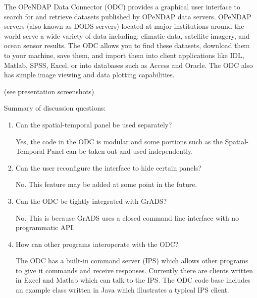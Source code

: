 The OPeNDAP Data Connector (ODC) provides a graphical user interface to search 
for and retrieve datasets published by OPeNDAP data servers. OPeNDAP servers 
(also known as DODS servers) located at major institutions around the world serve a 
wide variety of data including: climatic data, satellite imagery, and ocean sensor 
results. The ODC allows you to find these datasets, download them to your machine, 
save them, and import them into client applications like IDL, Matlab, SPSS, Excel, or 
into databases such as Access and Oracle. The ODC also has simple image viewing 
and data plotting capabilities.

(see presentation screenshots)

Summary of discussion questions:

\begin{enumerate}

  \item Can the spatial-temporal panel be used separately?

Yes, the code in the ODC is modular and some portions such as the Spatial-
Temporal Panel can be taken out and used independently.

  \item Can the user reconfigure the interface to hide certain panels?

No. This feature may be added at some point in the future.

  \item Can the ODC be tightly integrated with GrADS?

No. This is because GrADS uses a closed command line interface with no 
programmatic API.

   \item How can other programs interoperate with the ODC?

The ODC has a built-in command server (IPS) which allows other programs to give it 
commands and receive responses. Currently there are clients written in Excel and 
Matlab which can talk to the IPS. The ODC code base includes an example class 
written in Java which illustrates a typical IPS client.


\end{enumerate}


%
%
%
%

